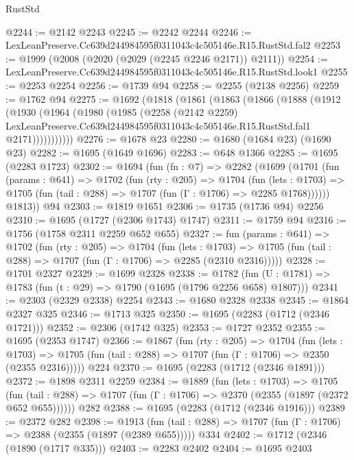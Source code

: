 \begin{lexlean}{RustStd}
\begin{coremodule}
@2244 := @2142 @2243
@2245 := @2242 @2244
@2246 := LexLeanPreserve.Cc639d244984595f0311043c4c505146e.R15.RustStd.fal2
@2253 := @1999 (@2008 (@2020 (@2029 (@2245 @2246 @2171)) @2111))
@2254 := LexLeanPreserve.Cc639d244984595f0311043c4c505146e.R15.RustStd.look1
@2255 := @2253 @2254
@2256 := @1739 @94
@2258 := @2255 (@2138 @2256)
@2259 := @1762 @94
@2275 := @1692
    (@1818
      (@1861
        (@1863
          (@1866
            (@1888
              (@1912
                (@1930
                  (@1964
                    (@1980
                      (@1985
                        (@2258
                          (@2142 @2259)
                          LexLeanPreserve.Cc639d244984595f0311043c4c505146e.R15.RustStd.fal1
                          @2171)))))))))))
@2276 := @1678 @23
@2280 := @1680 (@1684 @23) (@1690 @23)
@2282 := @1695 (@1649 @1696)
@2283 := @648 @1366
@2285 := @1695 (@2283 @1723)
@2302 := @1694
    (fun (fn : @7) =>
    @2282
      (@1699
        (@1701
          (fun (params : @641) =>
          @1702
            (fun (rty : @205) =>
            @1704
              (fun (lets : @1703) =>
              @1705 (fun (tail : @288) => @1707 (fun (Γ : @1706) => @2285 @1768))))))
        @1813))
    @94
@2303 := @1819 @1651
@2306 := @1735 (@1736 @94) @2256
@2310 := @1695 (@1727 (@2306 @1743) @1747)
@2311 := @1759 @94
@2316 := @1756 (@1758 @2311 @2259 @652 @655)
@2327 := fun (params : @641) =>
  @1702
    (fun (rty : @205) =>
    @1704
      (fun (lets : @1703) =>
      @1705 (fun (tail : @288) => @1707 (fun (Γ : @1706) => @2285 (@2310 @2316)))))
@2328 := @1701 @2327
@2329 := @1699 @2328
@2338 := @1782 (fun (U : @1781) => @1783 (fun (t : @29) => @1790 (@1695 (@1796 @2256 @658) @1807)))
@2341 := @2303 (@2329 @2338) @2254
@2343 := @1680 @2328 @2338
@2345 := @1864 @2327 @325
@2346 := @1713 @325
@2350 := @1695 (@2283 (@1712 (@2346 @1721)))
@2352 := @2306 (@1742 @325)
@2353 := @1727 @2352
@2355 := @1695 (@2353 @1747)
@2366 := @1867
    (fun (rty : @205) =>
    @1704
      (fun (lets : @1703) =>
      @1705 (fun (tail : @288) => @1707 (fun (Γ : @1706) => @2350 (@2355 @2316)))))
    @224
@2370 := @1695 (@2283 (@1712 (@2346 @1891)))
@2372 := @1898 @2311 @2259
@2384 := @1889
    (fun (lets : @1703) =>
    @1705 (fun (tail : @288) => @1707 (fun (Γ : @1706) => @2370 (@2355 (@1897 (@2372 @652 @655))))))
    @282
@2388 := @1695 (@2283 (@1712 (@2346 @1916)))
@2389 := @2372 @282
@2398 := @1913
    (fun (tail : @288) => @1707 (fun (Γ : @1706) => @2388 (@2355 (@1897 (@2389 @655)))))
    @334
@2402 := @1712 (@2346 (@1890 (@1717 @335)))
@2403 := @2283 @2402
@2404 := @1695 @2403

\end{coremodule}
\end{lexlean}
